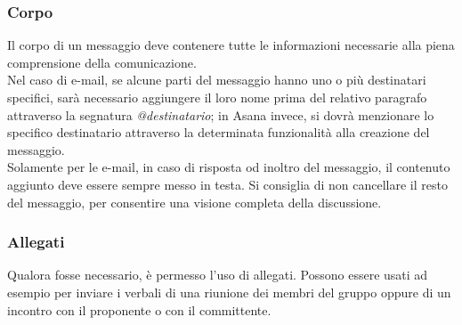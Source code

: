 \documentclass[../NormeDiProgetto.tex]{subfiles}
\begin{document}
			\subsubsection{Corpo}
				Il corpo di un messaggio deve contenere tutte le informazioni
				necessarie alla piena comprensione della comunicazione.\\
				Nel caso di e-mail, se alcune parti del messaggio hanno uno o più destinatari specifici,
				sarà necessario aggiungere il loro nome	prima del relativo paragrafo
				attraverso la segnatura	\textit{@destinatario};
				in Asana invece, si dovrà menzionare lo specifico destinatario
				attraverso la determinata funzionalità alla creazione del messaggio.\\
				Solamente per le e-mail, in caso di risposta od inoltro del
				messaggio, il contenuto aggiunto deve essere sempre messo in testa.
				Si consiglia di non cancellare il resto del messaggio,
				per consentire una visione completa della discussione.
			\subsubsection{Allegati}
				Qualora fosse necessario, è permesso l'uso di allegati. Possono
				essere usati ad esempio per inviare i verbali di una riunione dei
				membri del gruppo oppure di un incontro con il proponente o con
				il committente.
\end{document}
